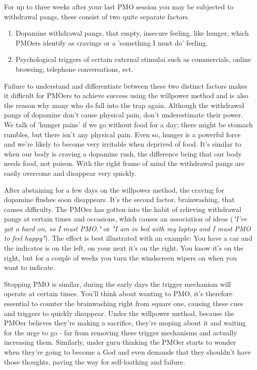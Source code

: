 \documentclass[easypeasy.tex]{subfiles}
\begin{document}
For up to three weeks after your last PMO session you may be subjected to withdrawal pangs, these consist of two quite separate factors.
\begin{enumerate}
  \item Dopamine withdrawal pangs, that empty, insecure feeling, like hunger, which PMOers identify as cravings or a 'something I must do' feeling.

  \item Psychological triggers of certain external stimulai such as commercials, online browsing, telephone conversations, ect.
\end{enumerate}

Failure to understand and differentiate between these two distinct factors makes it difficult for PMOers to achieve success using the willpower method and is also the reason why many who do fall into the trap again. Although the withdrawal pangs of dopamine don't cause physical pain, don't underestimate their power. We talk of 'hunger pains' if we go without food for a day; there might be stomach rumbles, but there isn't any physical pain. Even so, hunger is a powerful force and we're likely to become very irritable when deprived of food. It's similar to when our body is craving a dopamine rush, the difference being that our body needs food, not poison. With the right frame of mind the withdrawal pangs are easily overcome and disappear very quickly.

After abstaining for a few days on the willpower method, the craving for dopamine flushes soon disappears. It's the second factor, brainwashing, that causes difficulty. The PMOer has gotten into the habit of relieving withdrawal pangs at certain times and occasions, which causes an association of ideas (\textit{"I've got a hard on, so I must PMO."} or \textit{"I am in bed with my laptop and I must PMO to feel happy"}). The effect is best illustrated with an example: You have a car and the indicator is on the left, on your next it's on the right. You know it's on the right, but for a couple of weeks you turn the windscreen wipers on when you want to indicate.

Stopping PMO is similar, during the early days the trigger mechanism will operate at certain times. You'll think about wanting to PMO, it's therefore essential to counter the brainwashing right from square one, causing these cues and triggers to quickly disappear. Under the willpower method, because the PMOer believes they're making a sacrifice, they're moping about it and waiting for the urge to go - far from removing these trigger mechanisms and actually increasing them. Similarly, under guru thinking the PMOer starts to wonder when they're going to become a God and even demands that they shouldn't have those thoughts, paving the way for self-loathing and failure.
\end{document}
